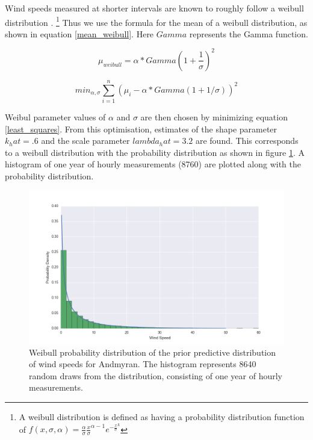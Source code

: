 \documentclass[11pt]{article}
\begin{document}
Wind speeds measured at shorter intervals are known to roughly follow a weibull distribution \citep{weibull_statistical_1951}. \footnote{A weibull distribution is defined as having a probability distribution function of $f(x, \sigma, \alpha) = \frac{\alpha}{\sigma} \frac{x}{\sigma}^{\alpha-1} e^{-\frac{x}{\sigma}^k}$} Thus we use the formula for the mean of a weibull distribution, as shown in equation \ref{mean_weibull}. Here $Gamma$ represents the Gamma function.

\begin{equation}
\mu_{weibull} = \alpha*Gamma(1+\frac{1}{\sigma})^2
\label{mean_weibull}
\end{equation}

\begin{equation}
min_{\alpha,\sigma} \sum_{i=1}^n (\mu_i - \alpha*Gamma(1+1/\sigma))^2
\label{least_squares}
\end{equation}

Weibul parameter values of $\alpha$ and $\sigma$ are then chosen by minimizing equation \ref{least_squares}. From this optimisation, estimates of the shape parameter $k_hat = .6$ and the scale parameter $lambda_hat = 3.2$ are found.  This corresponds to a weibull distribution with the probability distribution as shown in figure \ref{weibull_distribution}. A histogram of one year of hourly measurements (8760) are plotted along with the probability distribution. 

\begin{figure}
	\includegraphics[width=1\textwidth]{figures/prior_distribution.png}
	\caption{Weibull probability distribution of the prior predictive distribution of wind speeds for Andmyran. The histogram represents 8640 random draws from the distribution, consisting of one year of hourly measurements.}
	\label{weibull_distribution}
\end{figure}
\end{document}
